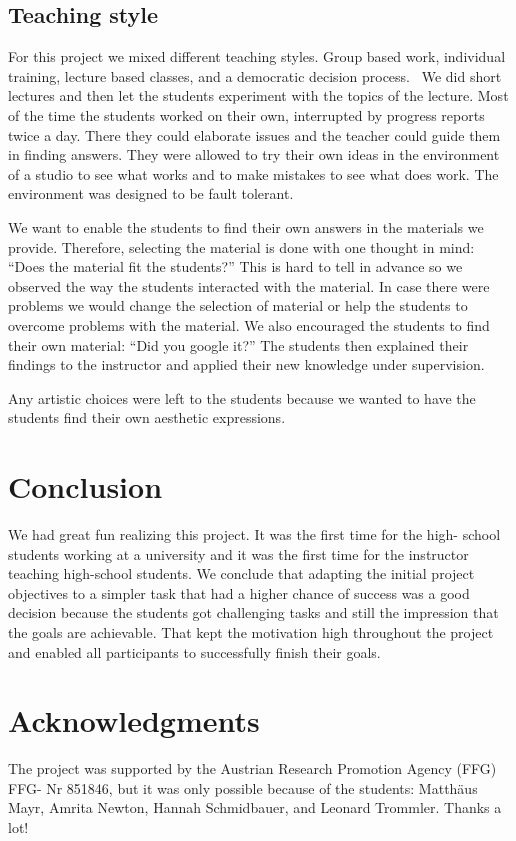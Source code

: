 \documentclass[onecolumn,nocopyrightspace,preprint]{sigplanconf}
\begin{document}
\subsection{Teaching style}

For this project we mixed different teaching styles. Group based work,
individual training, lecture based classes, and a democratic decision
process.~\cite{book:Hubwieser2007} We did short lectures and then let the
students experiment with the topics of the lecture. Most of the time the
students worked on their own, interrupted by progress reports twice a day.
There they could elaborate issues and the teacher could guide them in finding
answers. They were allowed to try their own ideas in the environment of a
studio to see what works and to make mistakes to see what does work. The
environment was designed to be fault tolerant.

We want to enable the students to find their own answers in the materials we
provide. Therefore, selecting the material is done with one thought in mind:
``Does the material fit the students?'' This is hard to tell in advance so we
observed the way the students interacted with the material. In case there were
problems we would change the selection of material or help the students to
overcome problems with the material. We also encouraged the students to find
their own material: ``Did you google it?'' The students then explained their
findings to the instructor and applied their new knowledge under supervision.

Any artistic choices were left to the students because we wanted to have the
students find their own aesthetic expressions.~\cite{book:Peez2008}

\section{Conclusion}

We had great fun realizing this project. It was the first time for the high-
school students working at a university and it was the first time for the
instructor teaching high-school students. We conclude that adapting the
initial project objectives to a simpler task that had a higher chance of
success was a good decision because the students got challenging tasks and
still the impression  that the goals are achievable. That kept the motivation
high throughout the project and enabled all participants to successfully
finish their goals.

\section{Acknowledgments}

The project was supported by the Austrian Research Promotion Agency (FFG) FFG-
Nr 851846, but it was only possible because of the students: Matthäus Mayr,
Amrita Newton, Hannah Schmidbauer, and Leonard Trommler. Thanks a lot!


 
\end{document}
